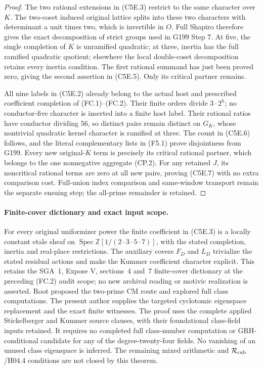 \begin{proof}
The two rational extensions in (C5E.3) restrict to the same
character over $K$.  The two-coset induced original lattice
splits into these two characters with determinant a unit times
two, which is invertible in $O$.  Full Shapiro therefore gives
the exact decomposition of strict groups used in G199 Step 7.
At five, the single completion of $K$ is unramified quadratic;
at three, inertia has the full ramified quadratic quotient;
elsewhere the local double-coset decomposition retains every
inertia condition.  The first rational summand has just been
proved zero, giving the second assertion in (C5E.5).
Only its critical partner remains.

All nine labels in (C5E.2) already belong to the actual host
and prescribed coefficient completion of (FC.1)--(FC.2).
Their finite orders divide $3\cdot2^h$; no conductor-five
character is inserted into a finite host label.
Their rational ratios have conductor dividing $56$, so
distinct pairs remain distinct on $G_K$, whose nontrivial
quadratic kernel character is ramified at three.
The count in (C5E.6) follows, and the literal complementary
lists in (F5.1) prove disjointness from G199.
Every new original-$K$ term is precisely its critical rational
partner, which belongs to the one nonnegative aggregate (CP.2).
For any retained $J$, its noncritical rational terms are zero
at all new pairs, proving (C5E.7) with no extra comparison cost.
Full-union index comparison and same-window transport remain
the separate ensuing step; the all-prime remainder is retained.
\end{proof}

\paragraph{Finite-cover dictionary and exact input scope.}
For every original uniformizer power the finite coefficient
in (C5E.3) is a locally constant etale sheaf on
$\operatorname{Spec}\mathbb Z[1/(2\cdot3\cdot5\cdot7)]$,
with the stated completion, inertia and real-place restrictions.
The auxiliary covers $F_D$ and $L_D$ trivialize the stated
residual actions and make the Kummer coefficient character explicit.
This retains the SGA~1, Expose V, sections~4 and~7 finite-cover
dictionary at the preceding (FC.2) audit scope; no new archival
reading or motivic realization is asserted.
Root proposed the two-prime CM route and explored full class
computations.  The present author supplies the targeted cyclotomic
eigenspace replacement and the exact finite witnesses.
The proof uses the complete applied Stickelberger and Kummer
source clauses, with their foundational class-field inputs retained.
It requires no completed full class-number computation or
GRH-conditional candidate for any of the degree-twenty-four fields.
No vanishing of an unused class eigenspace is inferred.
The remaining mixed arithmetic and $\mathcal R_{\rm cub}$/H04.4
conditions are not closed by this theorem.
